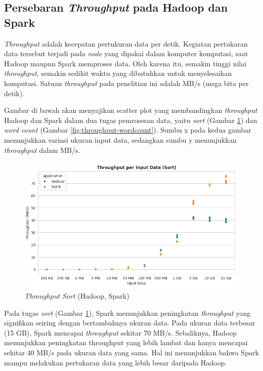 \subsection {Persebaran \textit{Throughput} pada Hadoop dan Spark}

\textit{Throughput} adalah kecepatan pertukuran data per detik. Kegiatan pertukaran data tersebut terjadi pada \textit{node} yang dipakai dalam komputer komputasi, saat Hadoop maupun Spark memproses data. Oleh karena itu, semakin tinggi nilai \textit{throughput}, semakin sedikit waktu yang dibutuhkan untuk menyelesaikan komputasi. Satuan \textit{throughput} pada penelitian ini adalah MB/s (mega bita per detik). 

Gambar di bawah akan menyajikan scatter plot yang membandingkan \textit{throughput} Hadoop dan Spark dalam dua tugas pemrosesan data, yaitu \textit{sort} (Gambar \ref{fig:throughput-sort}) dan \textit{word count} (Gambar \ref{fig:throughput-wordcount}). Sumbu x pada kedua gambar menunjukkan variasi ukuran input data, sedangkan sumbu y menunjukkan \textit{throughput} dalam MB/s. 

\begin{figure}[h]
    \centering
    \includegraphics[width=1\textwidth]{figures/ch04/1-throughput-sort.png}
    \caption{\textit{Throughput Sort} (Hadoop, Spark)}
    \label{fig:throughput-sort}
\end{figure}

Pada tugas \textit{sort} (Gambar \ref{fig:throughput-sort}), Spark menunjukkan peningkatan \textit{throughput} yang signifikan seiring dengan bertambahnya ukuran data. Pada ukuran data terbesar (15 GB), Spark mencapai \textit{throughput} sekitar 70 MB/s. Sebaliknya, Hadoop menunjukkan peningkatan throughput yang lebih lambat dan hanya mencapai sekitar 40 MB/s pada ukuran data yang sama. Hal ini menunjukkan bahwa Spark mampu melakukan pertukaran data yang lebih besar daripada Hadoop.

